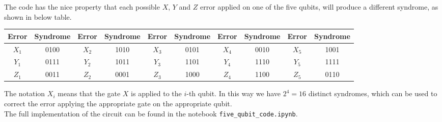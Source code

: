\documentclass{article}
\begin{document}
 	\noindent The code has the nice property that each possible $X$, $Y$ and $Z$ error applied on one of the five qubits, will produce a different syndrome, as shown in below table. 
 	\begin{table}[H]
 		\centering
 		\begin{tabular}{|c|c||c|c||c|c||c|c||c|c|}
 			\hline
 			Error & Syndrome & Error & Syndrome & Error & Syndrome & Error & Syndrome & Error & Syndrome \\ \hline \hline
 			$X_1$  & 0100 & $X_2$  & 1010 & $X_3$  & 0101 & $X_4$ & 0010 & $X_5$ & 1001 \\ \hline
 			$Y_1$  & 0111 & $Y_2$  & 1011 & $Y_3$  & 1101 & $Y_4$ & 1110 & $Y_5$ & 1111 \\ \hline
 			$Z_1$  & 0011 & $Z_2$  & 0001 & $Z_3$  & 1000 & $Z_4$ & 1100 & $Z_5$ & 0110 \\ \hline
 		\end{tabular}
 	\end{table}
 	\noindent The notation $X_i$ means that the gate $X$ is applied to the $i$-th qubit. In this way we have $2^4 = 16$ distinct syndromes, which can be used to correct the error applying the appropriate gate on the appropriate qubit.\\
 	The full implementation of the circuit can be found in the notebook \verb|five_qubit_code.ipynb|.
	 
	\newpage
	\nocite{devitt2013quantum}
	\nocite{nielsen2002quantum}
	\nocite{10.5555/1206629}
	
	
\end{document}
